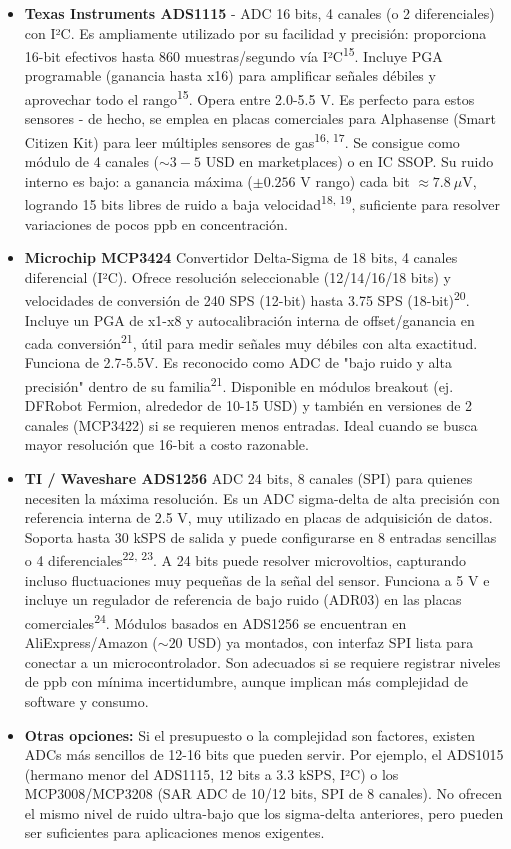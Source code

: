 \documentclass[a4paper, 12pt]{article}
\begin{document}
\begin{itemize}
    \item \textbf{Texas Instruments ADS1115} - ADC 16 bits, 4 canales (o 2 diferenciales) con I²C. Es ampliamente utilizado por su facilidad y precisión: proporciona 16-bit efectivos hasta 860 muestras/segundo vía I²C\textsuperscript{15}. Incluye PGA programable (ganancia hasta x16) para amplificar señales débiles y aprovechar todo el rango\textsuperscript{15}. Opera entre 2.0-5.5 V. Es perfecto para estos sensores - de hecho, se emplea en placas comerciales para Alphasense (Smart Citizen Kit) para leer múltiples sensores de gas\textsuperscript{16, 17}. Se consigue como módulo de 4 canales ($\sim 3-5$ USD en marketplaces) o en IC SSOP. Su ruido interno es bajo: a ganancia máxima ($\pm 0.256$ V rango) cada bit $\approx 7.8~\mu$V, logrando 15 bits libres de ruido a baja velocidad\textsuperscript{18, 19}, suficiente para resolver variaciones de pocos ppb en concentración.

    \item \textbf{Microchip MCP3424} Convertidor Delta-Sigma de 18 bits, 4 canales diferencial (I²C). Ofrece resolución seleccionable (12/14/16/18 bits) y velocidades de conversión de 240 SPS (12-bit) hasta 3.75 SPS (18-bit)\textsuperscript{20}. Incluye un PGA de x1-x8 y autocalibración interna de offset/ganancia en cada conversión\textsuperscript{21}, útil para medir señales muy débiles con alta exactitud. Funciona de 2.7-5.5V. Es reconocido como ADC de "bajo ruido y alta precisión" dentro de su familia\textsuperscript{21}. Disponible en módulos breakout (ej. DFRobot Fermion, alrededor de 10-15 USD) y también en versiones de 2 canales (MCP3422) si se requieren menos entradas. Ideal cuando se busca mayor resolución que 16-bit a costo razonable.

    \item \textbf{TI / Waveshare ADS1256} ADC 24 bits, 8 canales (SPI) para quienes necesiten la máxima resolución. Es un ADC sigma-delta de alta precisión con referencia interna de 2.5 V, muy utilizado en placas de adquisición de datos. Soporta hasta 30 kSPS de salida y puede configurarse en 8 entradas sencillas o 4 diferenciales\textsuperscript{22, 23}. A 24 bits puede resolver microvoltios, capturando incluso fluctuaciones muy pequeñas de la señal del sensor. Funciona a 5 V e incluye un regulador de referencia de bajo ruido (ADR03) en las placas comerciales\textsuperscript{24}. Módulos basados en ADS1256 se encuentran en AliExpress/Amazon ($\sim 20$ USD) ya montados, con interfaz SPI lista para conectar a un microcontrolador. Son adecuados si se requiere registrar niveles de ppb con mínima incertidumbre, aunque implican más complejidad de software y consumo.

    \item \textbf{Otras opciones:} Si el presupuesto o la complejidad son factores, existen ADCs más sencillos de 12-16 bits que pueden servir. Por ejemplo, el ADS1015 (hermano menor del ADS1115, 12 bits a 3.3 kSPS, I²C) o los MCP3008/MCP3208 (SAR ADC de 10/12 bits, SPI de 8 canales). No ofrecen el mismo nivel de ruido ultra-bajo que los sigma-delta anteriores, pero pueden ser suficientes para aplicaciones menos exigentes.
\end{itemize}
\end{document}
